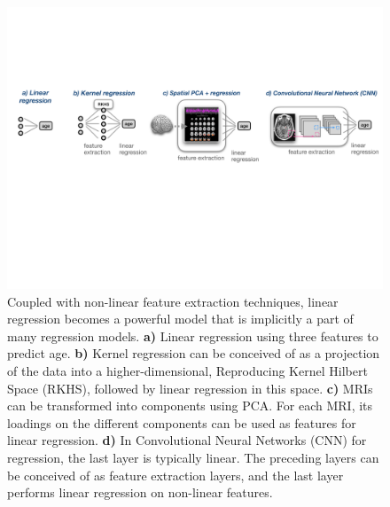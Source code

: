 \documentclass[utf8]{frontiersSCNS} %
\begin{document}
\begin{figure}[h!]
\begin{center}
\includegraphics[width=1.\textwidth]{regression_models}
\end{center}
\caption{Coupled with non-linear feature extraction techniques, linear regression becomes a powerful model that is implicitly a part of many regression models. \textbf{a)} Linear regression using three features to predict age. \textbf{b)} Kernel regression can be conceived of as a projection of the data into a higher-dimensional, Reproducing Kernel Hilbert Space (RKHS), followed by linear regression in this space. \textbf{c)} MRIs can be transformed into components using PCA. For each MRI, its loadings on the different components can be used as features for linear regression. \textbf{d)} In Convolutional Neural Networks (CNN) for regression, the last layer is typically linear. The preceding layers can be conceived of as feature extraction layers, and the last layer performs linear regression on non-linear features.}\label{fig:regression_models}
\end{figure}


\end{document}
